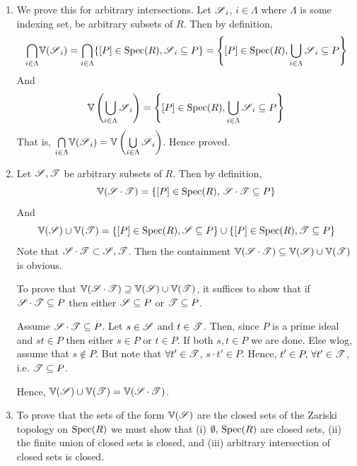 \documentclass[Notebook.tex]{subfiles}
\begin{document}
\begin{solution}
    \bbni 
    \begin{enumerate} [label=(\alph*),ref=\theenumi\alph*]
        \item We prove this for arbitrary intersections. Let $\cS_i$, $i \in \Lambda$ where $\Lambda$ is some indexing set, be arbitrary subsets of $R$. Then by definition,
        \[\underset{i\in \Lambda}{\bigcap}\V(\cS_i) = \underset{i \in \Lambda}{\bigcap}\{[P] \in \Spec(R), \cS_i \subseteq P\} = \left \{[P] \in \Spec(R), \underset{i\in \Lambda}{\bigcup}\cS_i \subseteq P \right \} \]
        And 
        \[\V \left (\underset{i \in \Lambda}{\bigcup} \cS_i  \right ) = \left \{[P] \in \Spec(R), \underset{i \in \Lambda}{\bigcup} \cS_i \subseteq P \right \} \]
        That is, $ \underset{i\in \Lambda}{\bigcap}\V(\cS_i) = \V \left (\underset{i \in \Lambda}{\bigcup} \cS_i  \right )$. Hence proved.

        \item Let $\cS, \cT$ be arbitrary subsets of $R$. Then by definition, 
        \[\V(\cS \cdot \cT) = \{[P] \in \Spec(R), \, \cS\cdot \cT \subseteq P\}\]
        And 
        \[\V(\cS) \cup \V(\cT) = \{[P] \in \Spec(R), \cS \subseteq P\} \cup \{[P] \in \Spec(R), \cT \subseteq P\}\] 
        Note that $\cS \cdot \cT \subset \cS, \cT$. Then the containment $\V(\cS \cdot \cT) \subseteq \V(\cS) \cup \V(\cT)$ is obvious. 
        
        To prove that $\V(\cS \cdot \cT) \supseteq \V(\cS) \cup \V(\cT)$, it suffices to show that if $\cS \cdot \cT \subseteq P$ then either $\cS \subseteq P$ or $\cT \subseteq P$. 
        
        Assume $\cS \cdot \cT \subseteq P$. Let $s \in \cS$ and $t \in \cT$. Then, since $P$ is a prime ideal and $st \in P$ then either $s \in P$ or $t \in P$. 
        If both $s, t \in P$ we are done. Else wlog, assume that $s \notin P$.
        But note that $\forall t' \in \cT$, $s\cdot t' \in P$. Hence, $t' \in P, \, \forall t' \in \cT$, i.e. $\cT \subseteq P$. 

        Hence, $\V(\cS) \cup \V(\cT) = \V(\cS \cdot \cT)$. 

        \item To prove that the sets of the form $\V(\cS)$ are the closed sets of the Zariski topology on $\Spec(R)$ we must show that (i) $\emptyset, \, \Spec(R)$ are closed sets, (ii) the finite union of closed sets is closed, and (iii) arbitrary intersection of closed sets is closed. 
        

\end{enumerate}
\end{solution}
\end{document}
